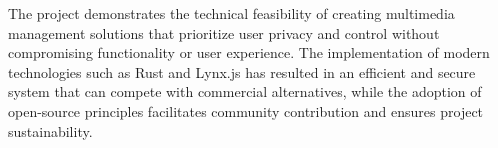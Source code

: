 The project demonstrates the technical feasibility of creating multimedia management solutions that prioritize user privacy and control without compromising functionality or user experience. The implementation of modern technologies such as Rust and Lynx.js has resulted in an efficient and secure system that can compete with commercial alternatives, while the adoption of open-source principles facilitates community contribution and ensures project sustainability.

\newpage
